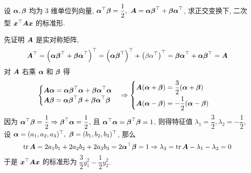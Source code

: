 
\begin{example}
    设 $\vb*{\alpha},\vb*{\beta}$ 均为 3 维单位列向量, $\vb*{\alpha}^\top\vb*{\beta}=\dfrac{1}{2},~\vb*{A}=\vb*{\alpha\beta}^\top+\vb*{\beta\alpha}^\top$, 求正交变换下, 二次型 $\vb*{x}^\top\vb*{Ax}$ 的标准形.
\end{example}
\begin{solution}
    先证明 $\vb*{A}$ 是实对称矩阵, 
    $$\vb*{A}^\top=\qty(\vb*{\alpha\beta}^\top+\vb*{\beta\alpha}^\top)^\top=\qty(\vb*{\alpha\beta}^\top)^\top+\qty(\beta\alpha^\top)^\top=\vb*{\beta\alpha}^\top+\vb*{\alpha\beta}^\top=\vb*{A}$$
    对 $\vb*{A}$ 右乘 $\vb*{\alpha}$ 和 $\vb*{\beta}$ 得
    $$\begin{cases}
            \vb*{A\alpha}=\vb*{\alpha\beta}^\top\vb*{\alpha}+\vb*{\beta\alpha}^\top\vb*{\alpha} \\
            \vb*{A\beta}=\vb*{\alpha\beta}^\top\vb*{\beta}+\vb*{\beta\alpha}^\top\vb*{\beta}
        \end{cases}\Rightarrow\begin{cases}
            \vb*{A}(\vb*{\alpha}+\vb*{\beta})=\dfrac{3}{2}(\vb*{\alpha}+\vb*{\beta}) \\[6pt]
            \vb*{A}(\vb*{\alpha}-\vb*{\beta})=-\dfrac{1}{2}(\vb*{\alpha}-\vb*{\beta})
        \end{cases}$$
    因为 $\vb*{\alpha}^\top\vb*{\beta}=\dfrac{1}{2}\Rightarrow\vb*{\beta}^\top\vb*{\alpha}=\dfrac{1}{2}$, 且 $\vb*{\alpha}^\top\vb*{\alpha}=\vb*{\beta}^\top\vb*{\beta}=1$, 则得特征值
    $\lambda_1=\dfrac{3}{2},\lambda_2=-\dfrac{1}{2}$, 设 $\vb*{\alpha}=(a_1,a_2,a_3)^\top,~\vb*{\beta}=(b_1,b_2,b_3)^\top$, 
    那么 $$\tr\vb*{A}=2a_1b_1+2a_2b_2+2a_3b_3=2\vb*{\alpha}^\top\vb*{\beta}=1\Rightarrow \lambda_3=\tr\vb*{A}-\lambda_1-\lambda_2=0$$
    于是 $\vb*{x}^\top\vb*{Ax}$ 的标准形为 $\dfrac{3}{2}y_1^2-\dfrac{1}{2}y_2^2.$
\end{solution}

